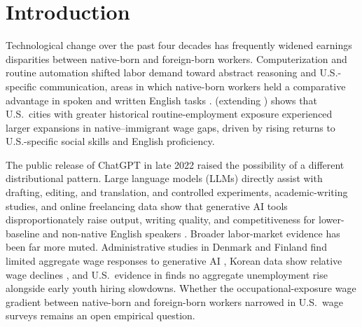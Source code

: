 \documentclass[11pt]{amsart}
\begin{document}
\section{Introduction}

Technological change over the past four decades has frequently widened earnings disparities between native-born and foreign-born workers. Computerization and routine automation shifted labor demand toward abstract reasoning and U.S.-specific communication, areas in which native-born workers held a comparative advantage in spoken and written English tasks \citep{AutorLevyMurnane2003, PeriSparber2009, AutorDorn2013, Deming2017}. \citet{Song2026JHC} (extending \citealp{Song2017}) shows that U.S.\ cities with greater historical routine-employment exposure experienced larger expansions in native--immigrant wage gaps, driven by rising returns to U.S.-specific social skills and English proficiency.

The public release of ChatGPT in late 2022 raised the possibility of a different distributional pattern. Large language models (LLMs) directly assist with drafting, editing, and translation, and controlled experiments, academic-writing studies, and online freelancing data show that generative AI tools disproportionately raise output, writing quality, and competitiveness for lower-baseline and non-native English speakers \citep{NoyZhang2023, Brynjolfsson2025, Dalaman2025, Koo2025, CaoLi2025SSRN}. Broader labor-market evidence has been far more muted. Administrative studies in Denmark and Finland find limited aggregate wage responses to generative AI \citep{HumlumVestergaard2025, KauhanenRouvinen2025}, Korean data show relative wage declines \citep{Lee2026}, and U.S.\ evidence in \citet{MassenkoffMcCrory2026} finds no aggregate unemployment rise alongside early youth hiring slowdowns. Whether the occupational-exposure wage gradient between native-born and foreign-born workers narrowed in U.S.\ wage surveys remains an open empirical question.
\end{document}
